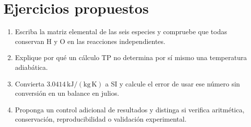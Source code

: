 \section{Ejercicios propuestos}
\begin{enumerate}
\item Escriba la matriz elemental de las seis especies y compruebe que todas conservan H y O en las reacciones independientes.
\item Explique por qué un cálculo TP no determina por sí mismo una temperatura adiabática.
\item Convierta $3.0414\,\mathrm{kJ/(kg\,K)}$ a SI y calcule el error de usar ese número sin conversión en un balance en julios.
\item Proponga un control adicional de resultados y distinga si verifica aritmética, conservación, reproducibilidad o validación experimental.
\end{enumerate}

